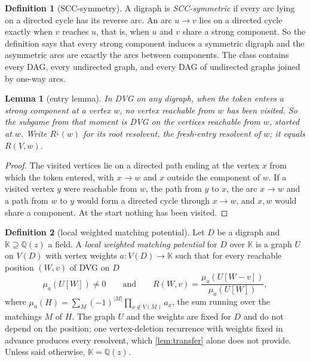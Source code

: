 \documentclass[11pt]{amsart}
\theoremstyle{plain}
\newtheorem{lemma}[theorem]{Lemma}
\theoremstyle{definition}
\newtheorem*{definition*}{Definition}
\theoremstyle{remark}
\numberwithin{equation}{section}
\newcommand{\QQ}{\mathbb{Q}}
\newcommand{\Qz}{\QQ(z)}
\newcommand{\Rdown}{R^{\downarrow}}
\begin{document}
\begin{definition*}[SCC-symmetry]
A digraph is \emph{SCC-symmetric} if every arc lying on a directed cycle has its reverse arc. An arc $u\to v$ lies on a directed cycle exactly when $v$ reaches $u$, that is, when $u$ and $v$ share a strong component. So the definition says that every strong component induces a symmetric digraph and the asymmetric arcs are exactly the arcs between components. The class contains every DAG, every undirected graph, and every DAG of undirected graphs joined by one-way arcs.
\end{definition*}

\begin{lemma}[entry lemma]\label{lem:entry}
In DVG on any digraph, when the token enters a strong component at a vertex $w$, no vertex reachable from $w$ has been visited. So the subgame from that moment is DVG on the vertices reachable from $w$, started at $w$. Write $\Rdown(w)$ for its root resolvent, the \emph{fresh-entry resolvent} of $w$; it equals $R(V,w)$.
\end{lemma}
\begin{proof}
The visited vertices lie on a directed path ending at the vertex $x$ from which the token entered, with $x\to w$ and $x$ outside the component of $w$. If a visited vertex $y$ were reachable from $w$, the path from $y$ to $x$, the arc $x\to w$ and a path from $w$ to $y$ would form a directed cycle through $x\to w$, and $x,w$ would share a component. At the start nothing has been visited.
\end{proof}

\begin{definition*}[local weighted matching potential]
Let $D$ be a digraph and $\mathbb K\supseteq\Qz$ a field. A \emph{local weighted matching potential} for $D$ over $\mathbb K$ is a graph $U$ on $V(D)$ with vertex weights $a\colon V(D)\to\mathbb K$ such that for every reachable position $(W,v)$ of DVG on $D$
\[
\mu_a(U[W])\neq0\qquad\text{and}\qquad R(W,v)=\frac{\mu_a(U[W-v])}{\mu_a(U[W])},
\]
where $\mu_a(H)=\sum_{M}(-1)^{|M|}\prod_{x\notin V(M)}a_x$, the sum running over the matchings $M$ of $H$. The graph $U$ and the weights are fixed for $D$ and do not depend on the position; one vertex-deletion recurrence with weights fixed in advance produces every resolvent, which \cref{lem:transfer} alone does not provide. Unless said otherwise, $\mathbb K=\Qz$.
\end{definition*}
\end{document}
